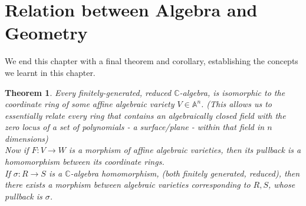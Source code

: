 \documentclass[12pt]{book}
\newtheorem{theorem}{Theorem}[chapter]
\theoremstyle{definition}
\begin{document}
\section{Relation between Algebra and Geometry}
We end this chapter with a final theorem and corollary, establishing the concepts we learnt in this chapter.
\begin{theorem}
    Every \textit{finitely-generated, reduced} $\mathbb{C}$-algebra, is isomorphic to the coordinate ring of some affine algebraic variety $V \in \mathbb{A}^n$. (This allows us to essentially relate every ring that contains an algebraically closed field with the zero locus of a set of polynomials - a surface/plane - within that field in $n$ dimensions) \\
    Now if $F: V \to W$ is a morphism of affine algebraic varieties, then its pullback is a homomorphism between its coordinate rings.\\
    If $\sigma: R \to S$ is a $\mathbb{C}$-algebra homomorphism, (both finitely generated, reduced), then there exists a morphism between algebraic varieties corresponding to $R, S$, whose pullback is $\sigma$.
\end{theorem}
\end{document}
